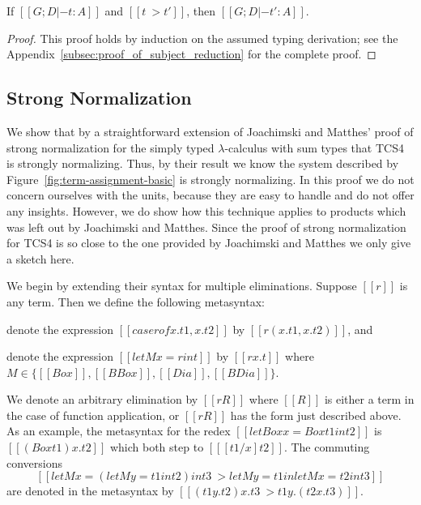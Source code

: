 \begin{lemma}
  \label{lemma:subject_reduction}
  If $[[G;D |- t : A]]$ and $[[t ~> t']]$, then $[[G;D |- t' : A]]$.
\end{lemma}
\begin{proof}
  This proof holds by induction on the assumed typing derivation; see
  the Appendix~\ref{subsec:proof_of_subject_reduction} for the
  complete proof.
\end{proof}

\subsection{Strong Normalization}
\label{subsec:strong_normalization}

We show that by a straightforward extension of Joachimski and Matthes'
\cite{Joachimski:2003} proof of strong normalization for the simply
typed $\lambda$-calculus with sum types that TCS4 is strongly
normalizing.  Thus, by their result we know the system described by
Figure~\ref{fig:term-assignment-basic} is strongly normalizing.  In
this proof we do not concern ourselves with the units, because they
are easy to handle and do not offer any insights.  However, we do show
how this technique applies to products which was left out by
Joachimski and Matthes.  Since the proof of strong normalization for
TCS4 is so close to the one provided by Joachimski and Matthes we only
give a sketch here.

We begin by extending their syntax for multiple eliminations.  Suppose
$[[r]]$ is any term. Then we define the following metasyntax:
\begin{description}
\item denote the expression $[[case r of x.t1,x.t2]]$ by $[[r (x.t1, x.t2)]]$, and
\item denote the expression $[[letM x = r in t]]$ by $[[r x.t]]$ where $M \in \{[[Box]], [[BBox]], [[Dia]], [[BDia]]\}$.
\end{description}
We denote an arbitrary elimination by $[[r R]]$ where $[[R]]$ is
either a term in the case of function application, or $[[r R]]$ has
the form just described above.  As an example, the metasyntax for
the redex $[[letBox x = Box t1 in t2]]$ is $[[(Box t1) x.t2]]$
which both step to $[[ [t1/x]t2]]$.  The commuting conversions
\[ [[letM x = (letM y = t1 in t2) in t3 ~> letM y = t1 in letM x = t2 in t3]] \]
are denoted in the metasyntax by $[[(t1 y.t2) x.t3 ~> t1 y.(t2 x.t3)]]$.

